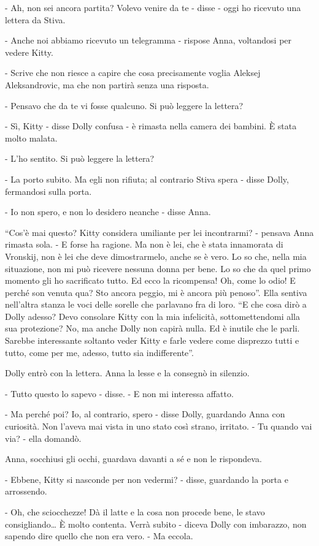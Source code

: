 - Ah, non sei ancora partita? Volevo venire da te - disse - oggi ho ricevuto una lettera da Stiva. 

- Anche noi abbiamo ricevuto un telegramma - rispose Anna, voltandosi per vedere Kitty. 

- Scrive che non riesce a capire che cosa precisamente voglia Aleksej Aleksandrovic, ma che non partirà senza una risposta. 

- Pensavo che da te vi fosse qualcuno. Si può leggere la lettera? 

- Sì, Kitty - disse Dolly confusa - è rimasta nella camera dei bambini. È stata molto malata. 

- L'ho sentito. Si può leggere la lettera? 

- La porto subito. Ma egli non rifiuta; al contrario Stiva spera - disse Dolly, fermandosi sulla porta. 

- Io non spero, e non lo desidero neanche - disse Anna. 

``Cos'è mai questo? Kitty considera umiliante per lei incontrarmi? - pensava Anna rimasta sola. - E forse ha ragione. Ma non è lei, che è stata innamorata di Vronskij, non è lei che deve dimostrarmelo, anche se è vero. Lo so che, nella mia situazione, non mi può ricevere nessuna donna per bene. Lo so che da quel primo momento gli ho sacrificato tutto. Ed ecco la ricompensa! Oh, come lo odio! E perché son venuta qua? Sto ancora peggio, mi è ancora più penoso''. Ella sentiva nell'altra stanza le voci delle sorelle che parlavano fra di loro. ``E che cosa dirò a Dolly adesso? Devo consolare Kitty con la mia infelicità, sottomettendomi alla sua protezione? No, ma anche Dolly non capirà nulla. Ed è inutile che le parli. Sarebbe interessante soltanto veder Kitty e farle vedere come disprezzo tutti e tutto, come per me, adesso, tutto sia indifferente''. 

Dolly entrò con la lettera. Anna la lesse e la consegnò in silenzio. 

- Tutto questo lo sapevo - disse. - E non mi interessa affatto. 

- Ma perché poi? Io, al contrario, spero - disse Dolly, guardando Anna con curiosità. Non l'aveva mai vista in uno stato così strano, irritato. - Tu quando vai via? - ella domandò. 

Anna, socchiusi gli occhi, guardava davanti a sé e non le rispondeva. 

- Ebbene, Kitty si nasconde per non vedermi? - disse, guardando la porta e arrossendo. 

- Oh, che sciocchezze! Dà il latte e la cosa non procede bene, le stavo consigliando\ldots{} È molto contenta. Verrà subito - diceva Dolly con imbarazzo, non sapendo dire quello che non era vero. - Ma eccola. 

